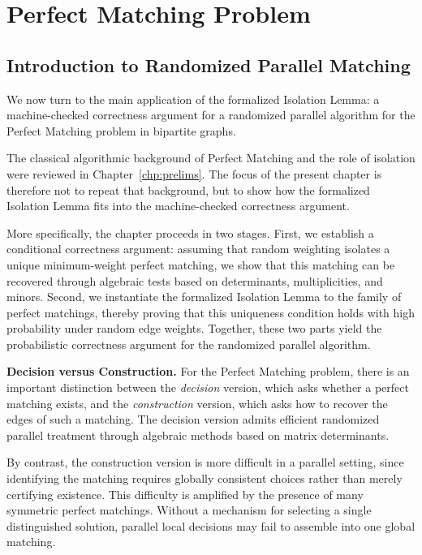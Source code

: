 \chapter{Perfect Matching Problem}
\label{chp:matching}

\section{Introduction to Randomized Parallel Matching}
\label{sec:matching_intro}

We now turn to the main application of the formalized Isolation Lemma: a machine-checked correctness argument for a randomized parallel algorithm for the Perfect Matching problem in bipartite graphs.

The classical algorithmic background of Perfect Matching and the role of isolation were reviewed in Chapter~\ref{chp:prelims}.
The focus of the present chapter is therefore not to repeat that background, but to show how the formalized Isolation Lemma fits into the machine-checked correctness argument.

More specifically, the chapter proceeds in two stages.
First, we establish a conditional correctness argument: assuming that random weighting isolates a unique minimum-weight perfect matching, we show that this matching can be recovered through algebraic tests based on determinants, multiplicities, and minors.
Second, we instantiate the formalized Isolation Lemma to the family of perfect matchings, thereby proving that this uniqueness condition holds with high probability under random edge weights.
Together, these two parts yield the probabilistic correctness argument for the randomized parallel algorithm.

\textbf{Decision versus Construction.}
For the Perfect Matching problem, there is an important distinction between the \emph{decision} version, which asks whether a perfect matching exists, and the \emph{construction} version, which asks how to recover the edges of such a matching.
The decision version admits efficient randomized parallel treatment through algebraic methods based on matrix determinants.

By contrast, the construction version is more difficult in a parallel setting, since identifying the matching requires globally consistent choices rather than merely certifying existence.
This difficulty is amplified by the presence of many symmetric perfect matchings.
Without a mechanism for selecting a single distinguished solution, parallel local decisions may fail to assemble into one global matching.


